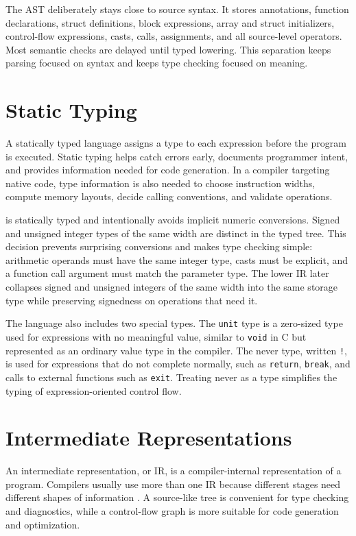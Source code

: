 The \epl{} AST deliberately stays close to source syntax. It stores annotations,
function declarations, struct definitions, block expressions, array and struct
initializers, control-flow expressions, casts, calls, assignments, and all
source-level operators. Most semantic checks are delayed until typed lowering.
This separation keeps parsing focused on syntax and keeps type checking focused
on meaning.

\section{Static Typing}

A statically typed language assigns a type to each expression before the program
is executed. Static typing helps catch errors early, documents programmer intent,
and provides information needed for code generation. In a compiler targeting
native code, type information is also needed to choose instruction widths,
compute memory layouts, decide calling conventions, and validate operations.

\epl{} is statically typed and intentionally avoids implicit numeric
conversions. Signed and unsigned integer types of the same width are distinct in
the typed tree. This decision prevents surprising conversions and makes type
checking simple: arithmetic operands must have the same integer type, casts must
be explicit, and a function call argument must match the parameter type. The
lower IR later collapses signed and unsigned integers of the same width into the
same storage type while preserving signedness on operations that need it.

The language also includes two special types. The \texttt{unit} type is a
zero-sized type used for expressions with no meaningful value, similar to
\texttt{void} in C but represented as an ordinary value type in the compiler. The
never type, written \texttt{!}, is used for expressions that do not complete
normally, such as \texttt{return}, \texttt{break}, and calls to external
functions such as \texttt{exit}. Treating never as a type simplifies the typing
of expression-oriented control flow.

\section{Intermediate Representations}

An intermediate representation, or IR, is a compiler-internal representation of
a program. Compilers usually use more than one IR because different stages need
different shapes of information \cite{muchnick1997advanced}. A source-like tree
is convenient for type checking and diagnostics, while a control-flow graph is
more suitable for code generation and optimization.

